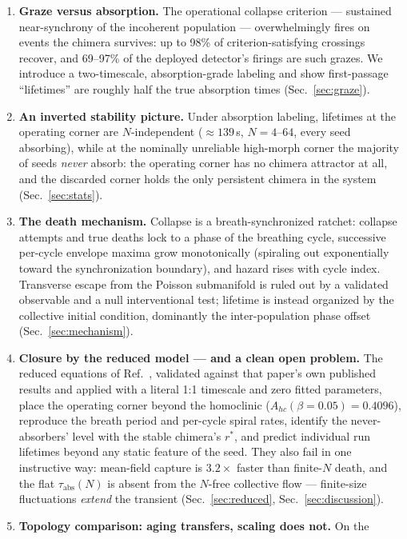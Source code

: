 \documentclass[pdflatex,sn-mathphys,Numbered]{sn-jnl}
\begin{document}
\begin{enumerate}
\item \textbf{Graze versus absorption.} The operational collapse criterion ---
sustained near-synchrony of the incoherent population --- overwhelmingly fires on
events the chimera survives: up to 98\% of criterion-satisfying crossings recover,
and 69--97\% of the deployed detector's firings are such grazes. We introduce a
two-timescale, absorption-grade labeling and show first-passage ``lifetimes'' are
roughly half the true absorption times (Sec.~\ref{sec:graze}).
\item \textbf{An inverted stability picture.} Under absorption labeling, lifetimes at
the operating corner are $N$-independent ($\approx 139$\,s, $N = 4$--$64$, every seed
absorbing), while at the nominally unreliable high-morph corner the majority of seeds
\emph{never} absorb: the operating corner has no chimera attractor at all, and the
discarded corner holds the only persistent chimera in the system
(Sec.~\ref{sec:stats}).
\item \textbf{The death mechanism.} Collapse is a breath-synchronized ratchet:
collapse attempts and true deaths lock to a phase of the breathing cycle, successive
per-cycle envelope maxima grow monotonically (spiraling out exponentially toward the
synchronization boundary), and hazard rises with cycle index. Transverse escape from
the Poisson submanifold is ruled out by a validated observable and a null
interventional test; lifetime is instead organized by the collective initial
condition, dominantly the inter-population phase offset (Sec.~\ref{sec:mechanism}).
\item \textbf{Closure by the reduced model --- and a clean open problem.} The reduced
equations of Ref.~\cite{abrams2008}, validated against that paper's own published
results and applied with a literal 1:1 timescale and zero fitted parameters, place
the operating corner beyond the homoclinic ($A_{hc}(\beta{=}0.05) = 0.4096$),
reproduce the breath period and per-cycle spiral rates, identify the never-absorbers'
level with the stable chimera's $r^*$, and predict individual run lifetimes beyond
any static feature of the seed. They also fail in one instructive way: mean-field
capture is $3.2\times$ faster than finite-$N$ death, and the flat
$\tau_{\mathrm{abs}}(N)$ is absent from the $N$-free collective flow --- finite-size
fluctuations \emph{extend} the transient (Sec.~\ref{sec:reduced},
Sec.~\ref{sec:discussion}).
\item \textbf{Topology comparison: aging transfers, scaling does not.} On the

\end{enumerate}
\end{document}
